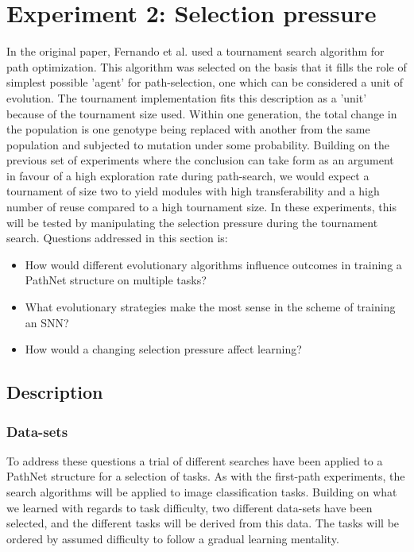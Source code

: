 \chapter{Experiment 2: Selection pressure}\label{exp2}
In the original paper, Fernando et al. used a tournament search algorithm for path optimization. This algorithm was selected on the basis that it fills the role of simplest possible 'agent' for path-selection, one which can be considered a unit of evolution.  The tournament implementation fits this description as a 'unit' because of the tournament size used. Within one generation, the total change in the population is one genotype being replaced with another from the same population and subjected to mutation under some probability. Building on the previous set of experiments where the conclusion can take form as an argument in favour of a high exploration rate during path-search, we would expect a tournament of size two to yield modules with high transferability and a high number of reuse compared to a high tournament size. In these experiments, this will be tested by manipulating the selection pressure during the tournament search. Questions addressed in this section is: 
\begin{itemize}
    \item How would different evolutionary algorithms influence outcomes in training a PathNet structure on multiple tasks?
    \item What evolutionary strategies make the most sense in the scheme of training an SNN?
    \item How would a changing selection pressure affect learning? 
\end{itemize}
\newpage

\section{Description}
\subsection{Data-sets} \label{exp2:datasets}
To address these questions a trial of different searches have been applied to a PathNet structure for a selection of tasks. As with the first-path experiments, the search algorithms will be applied to image classification tasks. Building on what we learned with regards to task difficulty, two different data-sets have been selected, and the different tasks will be derived from this data. The tasks will be ordered by assumed difficulty to follow a gradual learning mentality. 

